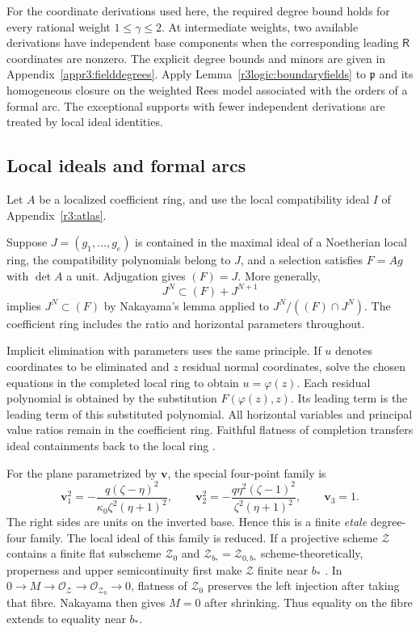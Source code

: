 \documentclass[11pt,a4paper]{article}
\numberwithin{equation}{section}
\theoremstyle{plain}
\theoremstyle{definition}
\theoremstyle{remark}
\begin{document}
For the coordinate derivations used here, the required degree bound
holds for every rational weight $1\le\gamma\le2$. At intermediate
weights, two available derivations have independent base components
when the corresponding leading $\mathsf R$ coordinates are nonzero. The
explicit degree bounds and minors are given in
Appendix~\ref{appr3:fielddegrees}. Apply Lemma~\ref{r3logic:boundaryfields}
to $\mathfrak p$ and its homogeneous closure on the weighted Rees model
associated with the orders of a formal arc. The exceptional supports
with fewer independent derivations are treated by local ideal identities.

\subsection{Local ideals and formal arcs}
\label{appr3:boundarylogic}

Let $A$ be a localized coefficient ring, and use the local compatibility
ideal $I$ of Appendix~\ref{r3:atlas}.

Suppose $J=(g_1,\ldots,g_e)$ is contained in the maximal ideal of a
Noetherian local ring, the compatibility polynomials belong to $J$, and a selection
satisfies $F=Ag$ with $\det A$ a unit. Adjugation gives $(F)=J$.
More generally,
\[
 J^N\subset(F)+J^{N+1}
\]
implies $J^N\subset(F)$ by Nakayama's lemma applied to
$J^N/((F)\cap J^N)$. The coefficient ring includes the ratio and
horizontal parameters throughout.

Implicit elimination with parameters uses the same principle.
If $u$ denotes coordinates to be eliminated and $z$ residual normal coordinates,
solve the chosen equations in the completed local ring to obtain
$u=\varphi(z)$. Each residual polynomial is obtained by the substitution
$F(\varphi(z),z)$. Its leading term is the leading term of this substituted polynomial. All horizontal
variables and principal value ratios remain in the coefficient ring. Faithful flatness of completion transfers ideal
containments back to the local ring \cite[Lemma~10.97.3, Tag~00MC]{StacksProject}.

For the plane parametrized by $\boldsymbol v$, the special four-point family is
\[
 \boldsymbol v_1^2=-\frac{q(\zeta -\eta )^2}{\kappa_0 \zeta ^2(\eta +1)^2},\qquad
 \boldsymbol v_2^2=-\frac{q\eta ^2(\zeta -1)^2}{\zeta ^2(\eta +1)^2},\qquad \boldsymbol v_3=1.
\]
The right sides are units on the inverted base. Hence this is a
finite \emph{etale} degree-four family. The local ideal of this family is reduced.
If a projective scheme $\mathscr Z$ contains a finite flat subscheme $\mathscr Z_0$ and
$\mathscr Z_{b_\ast}=\mathscr Z_{0,b_\ast}$ scheme-theoretically, properness and upper
semicontinuity first make $\mathscr Z$ finite near $b_\ast$
\cite[Lemma~37.44.2, Tag~02UP]{StacksProject}. In
$0\to M\to\mathcal O_{\mathscr Z} \to\mathcal O_{\mathscr Z_0}\to0$, flatness of $\mathscr Z_0$
preserves the left injection after taking that fibre. Nakayama then
gives $M=0$ after shrinking. Thus equality on the fibre extends to equality near $b_\ast$.
\end{document}
